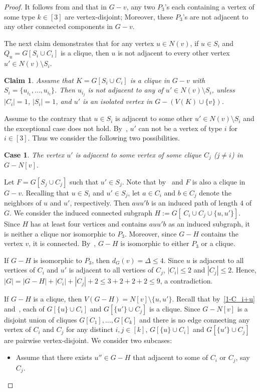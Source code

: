 \documentclass[a4paper,12pt]{article}
\theoremstyle{plain}
\newtheorem{claim}{Claim}[section]
\newenvironment{proof*}{\noindent \emph{Proof of the claim.}}{\hfill$\Diamond$}
\begin{document}
\begin{proof}
\medskip
It follows from  and  that in $G-v$, any two $P_3$'s each containing a vertex of some type $k \in [3]$ are vertex-disjoint; Moreover, these $P_3$'s are not adjacent to any other connected components in $G-v$.

The next claim demonstrates that for any vertex $u \in N(v)$, if $u\in S_i$ and $Q_u=G[S_i\cup C_i]$ is a clique, then $u$ is not adjacent to every other vertex $u'\in N(v)\setminus S_i$.

\begin{claim}\label{claim:last claim}
Assume that $K=G[S_i\cup C_i]$ is a clique in $G-v$ with $S_i=\{u_{i_1}, \ldots, u_{i_t}\}$.  Then $u_{i_j}$ is not adjacent to any of $u'\in N(v)\setminus S_i$, unless $|C_i|=1$, $|S_i|=1$, and $u'$ is an isolated vertex in $G-(V(K)\cup \{v\})$.  
\end{claim}

\begin{proof*}
Assume to the contrary that $u\in S_i$ is adjacent to some other $u'\in N(v)\setminus S_i$ and the exceptional case does not hold. By~, $u'$ can not be a vertex of type $i$ for $i\in [3]$. Thus we consider the following two possibilities. 


\smallskip
\noindent
{\bf Case 1}. \emph{The vertex $u'$ is adjacent to some vertex of some clique $C_j$ ($j\neq i$) in $G-N[v]$.}
\smallskip

Let $F=G[S_j\cup C_j]$ such that $u'\in S_j$. Note that by~ and  $F$ is also a clique in $G-v$. Recalling that $u\in S_i$ and $u'\in S_j$, 
let $a \in C_i$ and $b \in C_j$ denote the neighbors of $u$ and $u'$, respectively. Then $ auu'b $ is an induced path of length $4$ of $G$. We consider the induced connected subgraph $H:=G[\ C_i\cup C_j\cup \{u,u'\}]$. Since $H$ has at least four vertices and contains $auu'b$ as an induced subgraph, it is neither a clique nor isomorphic to $P_3$. Moreover, since $G-H$ contains the vertex $v$, it is connected. By~, $G-H$ is isomorphic to either $P_3$ or a clique.


If $G-H$ is isomorphic to $P_3$, then $d_G(v)=\Delta \leq 4$. Since $u$ is adjacent to all vertices of $C_i$ and $u'$ is adjacent to all vertices of $C_j$, $|C_i|\leq 2$ and $|C_j|\leq 2$. Hence, $|G|=|G-H|+|C_i|+|C_j|+2\leq 3+2+2+2\leq 9$, a contradiction.


If $G-H$ is a clique, then $V(G-H)=N[v]\setminus \{u,u'\}$. Recall that by~\ref{1-C_i+u} and~, each of $G[\{u\}\cup C_i]$ and $G[\{u'\}\cup C_j]$ is a clique. Since $G-N[v]$ is a disjoint union of cliques $G[C_1], \ldots, G[C_k]$ and there is no edge connecting any vertex of $C_i$ and $C_j$ for any distinct $i,j\in [k]$, $G[\{u\}\cup C_i]$ and $G[\{u'\}\cup C_j]$ are pairwise vertex-disjoint. We consider two subcases:
\begin{itemize}
    \item Assume that there exists $u''\in G-H$ that adjacent to some of $C_i$ or $C_j$, say $C_j$. 
    

\end{itemize}
\end{proof*}
\end{proof}
\end{document}
